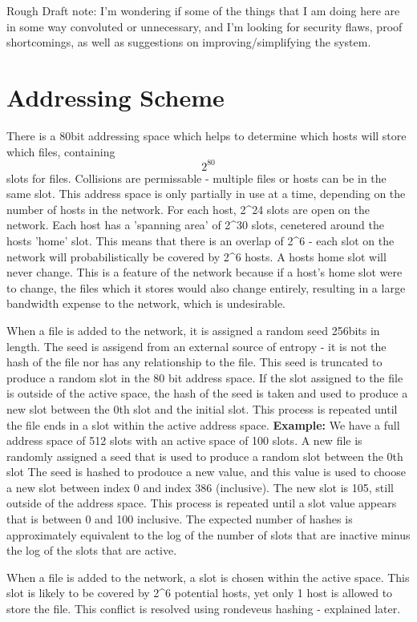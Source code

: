 \documentclass[twocolumn]{article}
\begin{document}
Rough Draft note: I'm wondering if some of the things that I am doing here are in some way convoluted or unnecessary, and I'm looking for security flaws, proof shortcomings, as well as suggestions on improving/simplifying the system.

\section{Addressing Scheme}
There is a 80bit addressing space which helps to determine which hosts will store which files, containing $$2^80$$ slots for files.
Collisions are permissable - multiple files or hosts can be in the same slot.
This address space is only partially in use at a time, depending on the number of hosts in the network. For each host, 2^24 slots are open on the network.
Each host has a 'spanning area' of 2^30 slots, cenetered around the hosts 'home' slot. This means that there is an overlap of 2^6 - each slot on the network will probabilistically be covered by 2^6 hosts.
A hosts home slot will never change.
This is a feature of the network because if a host's home slot were to change, the files which it stores would also change entirely, resulting in a large bandwidth expense to the network, which is undesirable.

When a file is added to the network, it is assigned a random seed 256bits in length.
The seed is assigend from an external source of entropy - it is not the hash of the file nor has any relationship to the file.
This seed is truncated to produce a random slot in the 80 bit address space.
If the slot assigned to the file is outside of the active space, the hash of the seed is taken and used to produce a new slot between the 0th slot and the initial slot.
This process is repeated until the file ends in a slot within the active address space.
\textbf{Example:} We have a full address space of 512 slots with an active space of 100 slots.
A new file is randomly assigned a seed that is used to produce a random slot between the 0th slot
The seed is hashed to prodouce a new value, and this value is used to choose a new slot between index 0 and index 386 (inclusive).
The new slot is 105, still outside of the address space.
This process is repeated until a slot value appears that is between 0 and 100 inclusive.
The expected number of hashes is approximately equivalent to the log of the number of slots that are inactive minus the log of the slots that are active.

When a file is added to the network, a slot is chosen within the active space.
This slot is likely to be covered by 2^6 potential hosts, yet only 1 host is allowed to store the file.
This conflict is resolved using rondeveus hashing - explained later.
\end{document}
